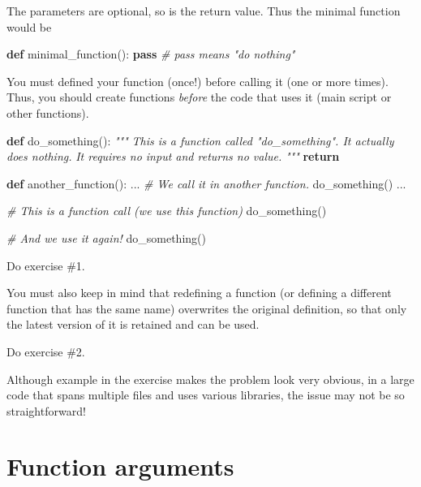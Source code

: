 \documentclass[
]{book}
\newenvironment{Shaded}{\begin{snugshade}}{\end{snugshade}}
\newcommand{\CommentTok}[1]{\textcolor[rgb]{0.56,0.35,0.01}{\textit{#1}}}
\newcommand{\ControlFlowTok}[1]{\textcolor[rgb]{0.13,0.29,0.53}{\textbf{#1}}}
\newcommand{\KeywordTok}[1]{\textcolor[rgb]{0.13,0.29,0.53}{\textbf{#1}}}
\newcommand{\NormalTok}[1]{#1}
\begin{document}
The parameters are optional, so is the return value. Thus the minimal function would be

\begin{Shaded}
\begin{Highlighting}[]
\KeywordTok{def}\NormalTok{ minimal\_function():}
    \ControlFlowTok{pass} \CommentTok{\# pass means "do nothing"}
\end{Highlighting}
\end{Shaded}

You must defined your function (once!) before calling it (one or more times). Thus, you should create functions \emph{before} the code that uses it (main script or other functions).

\begin{Shaded}
\begin{Highlighting}[]
\KeywordTok{def}\NormalTok{ do\_something():}
    \CommentTok{"""}
\CommentTok{    This is a function called "do\_something". It actually does nothing.}
\CommentTok{    It requires no input and returns no value.}
\CommentTok{    """}
    \ControlFlowTok{return}
    
    
\KeywordTok{def}\NormalTok{ another\_function():}
\NormalTok{    ...}
    \CommentTok{\# We call it in another function.}
\NormalTok{    do\_something()}
\NormalTok{    ...}
    
    
\CommentTok{\# This is a function call (we use this function)}
\NormalTok{do\_something()}

\CommentTok{\# And we use it again!}
\NormalTok{do\_something()}
\end{Highlighting}
\end{Shaded}

Do exercise \#1.

You must also keep in mind that redefining a function (or defining a different function that has the same name) overwrites the original definition, so that only the latest version of it is retained and can be used.

Do exercise \#2.

Although example in the exercise makes the problem look very obvious, in a large code that spans multiple files and uses various libraries, the issue may not be so straightforward!

\hypertarget{function-arguments}{%
\section{Function arguments}\label{function-arguments}}
\end{document}
